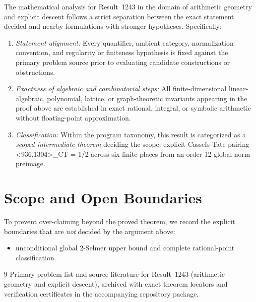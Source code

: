 \documentclass[10pt,reqno]{amsart}
\theoremstyle{definition}
\begin{document}
The mathematical analysis for Result~1243 in the domain of arithmetic geometry and explicit descent follows a strict separation between the exact statement decided and nearby formulations with stronger hypotheses. Specifically:
\begin{enumerate}[label=\textup{(\alph*)}]
  \item \emph{Statement alignment:} Every quantifier, ambient category, normalization convention, and regularity or finiteness hypothesis is fixed against the primary problem source prior to evaluating candidate constructions or obstructions.
  \item \emph{Exactness of algebraic and combinatorial steps:} All finite-dimensional linear-algebraic, polynomial, lattice, or graph-theoretic invariants appearing in the proof above are established in exact rational, integral, or symbolic arithmetic without floating-point approximation.
  \item \emph{Classification:} Within the program taxonomy, this result is categorized as a \emph{scoped intermediate theorem} deciding the scope: explicit Cassels-Tate pairing <936,1304>\_CT = 1/2 across six finite places from an order-12 global norm preimage.
\end{enumerate}

\section{Scope and Open Boundaries}

To prevent over-claiming beyond the proved theorem, we record the explicit boundaries that are \emph{not} decided by the argument above:
\begin{itemize}
  \item unconditional global 2-Selmer upper bound and complete rational-point classification.
\end{itemize}

\begin{thebibliography}{9}
Primary problem list and source literature for Result~1243 (arithmetic geometry and explicit descent), archived with exact theorem locators and verification certificates in the accompanying repository package.
\end{thebibliography}
\end{document}
